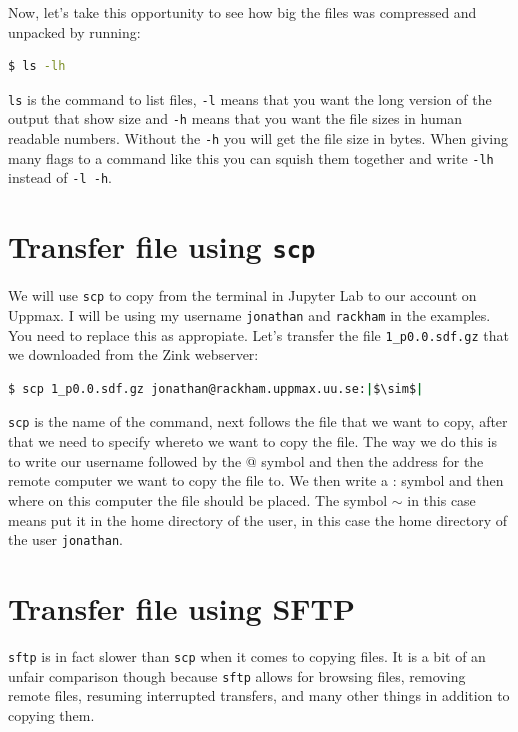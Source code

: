\documentclass[watermark]{pbpreprint}
\begin{document}
\vspace{1\baselineskip}
Now, let's take this opportunity to see how big the files was compressed and
unpacked by running: 
\begin{lstlisting}[language=bash]
$ ls -lh
\end{lstlisting}
\texttt{ls} is the command to list files, \texttt{-l} means that you want the
long version of the output that show size and \texttt{-h} means that you want
the file sizes in human readable numbers. Without the \texttt{-h} you will get
the file size in bytes. When giving many flags to a command like this you can
squish them together and write \texttt{-lh} instead of \texttt{-l -h}.

\section{Transfer file using \texttt{scp}}
 We will use \texttt{scp} to copy from the terminal
in Jupyter Lab to our account on Uppmax. I will be using my username
\texttt{jonathan} and \texttt{rackham} in the examples. You need to replace
this as appropiate. Let's transfer the file \texttt{1\_p0.0.sdf.gz} that we
downloaded from the Zink webserver:
%
\begin{lstlisting}[language=bash,escapechar={|}]
$ scp 1_p0.0.sdf.gz jonathan@rackham.uppmax.uu.se:|$\sim$|
\end{lstlisting}
\texttt{scp} is the name of the command, next follows the file that we want to
copy, after that we need to specify whereto we want to copy the file. The way
we do this is to write our username followed by the @ symbol and then the
address for the remote computer we want to copy the file to. We then write a :
symbol and then where on this computer the file should be placed. The symbol
$\sim$ in this case means put it in the home directory of the user, in this
case the home directory of the user \texttt{jonathan}.

\section{Transfer file using SFTP}
\texttt{sftp} is in fact slower than \texttt{scp} when it comes to copying
files. It is a bit of an unfair comparison though because \texttt{sftp} allows
for browsing files, removing remote files, resuming interrupted transfers, and
many other things in addition to copying them.
\end{document}

